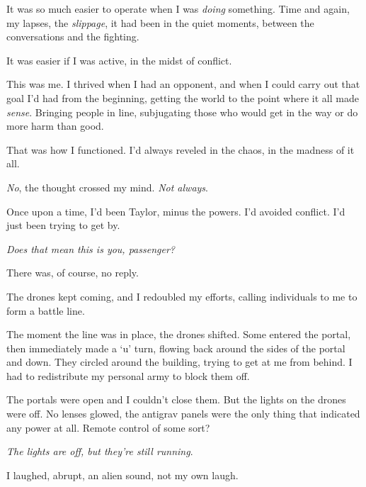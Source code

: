 It was so much easier to operate when I was \emph{doing} something.  Time and again, my lapses, the \emph{slippage}, it had been in the quiet moments, between the conversations and the fighting.



It was easier if I was active, in the midst of conflict.



This was me.  I thrived when I had an opponent, and when I could carry out that goal I'd had from the beginning, getting the world to the point where it all made \emph{sense}.  Bringing people in line, subjugating those who would get in the way or do more harm than good.



That was how I functioned.  I'd always reveled in the chaos, in the madness of it all.



\emph{No}, the thought crossed my mind.  \emph{Not always}.



Once upon a time, I'd been Taylor, minus the powers.  I'd avoided conflict.  I'd just been trying to get by.



\emph{Does that mean this is you, passenger?}



There was, of course, no reply.



The drones kept coming, and I redoubled my efforts, calling individuals to me to form a battle line.



The moment the line was in place, the drones shifted.  Some entered the portal, then immediately made a `u' turn, flowing back around the sides of the portal and down.  They circled around the building, trying to get at me from behind.  I had to redistribute my personal army to block them off.



The portals were open and I couldn't close them.  But the lights on the drones were off.  No lenses glowed, the antigrav panels were the only thing that indicated any power at all.  Remote control of some sort?



\emph{The lights are off, but they're still running}.



I laughed, abrupt, an alien sound, not my own laugh.



